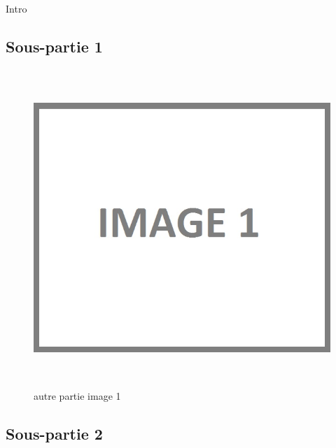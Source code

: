 Intro

\subsection{Sous-partie 1}

\begin{figure}[!ht]
\begin{center}
\includegraphics[height=12cm]{autre_partie/image1}
\end{center}
\caption[autre partie générale]{autre partie image 1\protect\footnotemark}
\end{figure}


\newpage{}

\subsection{Sous-partie 2}

